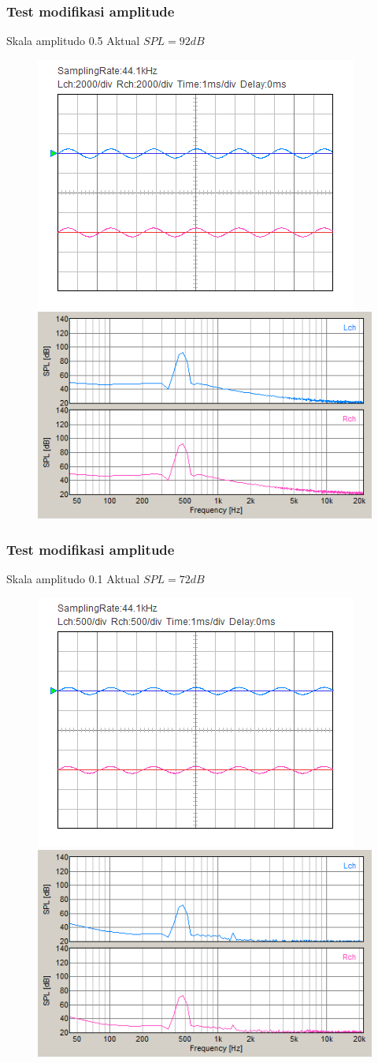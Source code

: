 \documentclass[table,dvipsnames,10pt]{beamer}
\begin{document}
	\begin{frame}[fragile]
	\frametitle{Test modifikasi amplitude}
	\begin{exampleblock}{Skala amplitudo 0.5}
		Aktual $SPL = 92 dB$
		\begin{figure}[H]
			\centering
			\includegraphics[width=0.4\linewidth]{result/day_4/500Hz/tone05}
			\includegraphics[width=0.45\linewidth]{result/day_4/500Hz/fft_tone05}
		\end{figure}
	\end{exampleblock}
	\end{frame}

	\begin{frame}[fragile]
	\frametitle{Test modifikasi amplitude}
	\begin{exampleblock}{Skala amplitudo 0.1}
		Aktual $SPL = 72 dB$
		\begin{figure}[H]
			\centering
			\includegraphics[width=0.4\linewidth]{result/day_4/500Hz/tone01}
			\includegraphics[width=0.45\linewidth]{result/day_4/500Hz/fft_tone01}
		\end{figure}
	\end{exampleblock}
	\end{frame}
\end{document}
